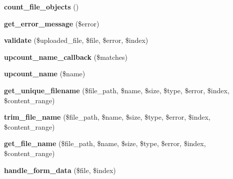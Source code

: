 \begin{DoxyCompactItemize}
\item 
\hypertarget{class_upload_handler_a56b6a5c87c3c4711203072d93625051d}{{\bfseries count\-\_\-file\-\_\-objects} ()}\label{class_upload_handler_a56b6a5c87c3c4711203072d93625051d}

\item 
\hypertarget{class_upload_handler_ad794fb9ba351e9e44499d3d5af1635c2}{{\bfseries get\-\_\-error\-\_\-message} (\$error)}\label{class_upload_handler_ad794fb9ba351e9e44499d3d5af1635c2}

\item 
\hypertarget{class_upload_handler_abd809343b5c960e5b97c725c6337b0c4}{{\bfseries validate} (\$uploaded\-\_\-file, \$file, \$error, \$index)}\label{class_upload_handler_abd809343b5c960e5b97c725c6337b0c4}

\item 
\hypertarget{class_upload_handler_a3a9abbb303b8995922826ed7a45d1a97}{{\bfseries upcount\-\_\-name\-\_\-callback} (\$matches)}\label{class_upload_handler_a3a9abbb303b8995922826ed7a45d1a97}

\item 
\hypertarget{class_upload_handler_a4449667ab140109509f8c58e98180297}{{\bfseries upcount\-\_\-name} (\$name)}\label{class_upload_handler_a4449667ab140109509f8c58e98180297}

\item 
\hypertarget{class_upload_handler_a163373f2907e116da9d127641beb04c3}{{\bfseries get\-\_\-unique\-\_\-filename} (\$file\-\_\-path, \$name, \$size, \$type, \$error, \$index, \$content\-\_\-range)}\label{class_upload_handler_a163373f2907e116da9d127641beb04c3}

\item 
\hypertarget{class_upload_handler_a4ec037e239c1745853a26d4f525dbf68}{{\bfseries trim\-\_\-file\-\_\-name} (\$file\-\_\-path, \$name, \$size, \$type, \$error, \$index, \$content\-\_\-range)}\label{class_upload_handler_a4ec037e239c1745853a26d4f525dbf68}

\item 
\hypertarget{class_upload_handler_afd05e42924ffa254e805d27c029c92bc}{{\bfseries get\-\_\-file\-\_\-name} (\$file\-\_\-path, \$name, \$size, \$type, \$error, \$index, \$content\-\_\-range)}\label{class_upload_handler_afd05e42924ffa254e805d27c029c92bc}

\item 
\hypertarget{class_upload_handler_a856f63c260031cbbf4762b47f3d7cbd0}{{\bfseries handle\-\_\-form\-\_\-data} (\$file, \$index)}\label{class_upload_handler_a856f63c260031cbbf4762b47f3d7cbd0}


\end{DoxyCompactItemize}
